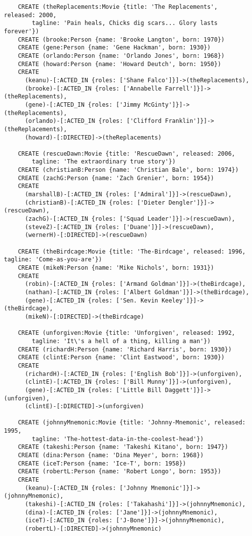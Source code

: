\begin{lstlisting}
	CREATE (theReplacements:Movie {title: 'The Replacements', released: 2000,
	    tagline: 'Pain heals, Chicks dig scars... Glory lasts forever'})
	CREATE (brooke:Person {name: 'Brooke Langton', born: 1970})
	CREATE (gene:Person {name: 'Gene Hackman', born: 1930})
	CREATE (orlando:Person {name: 'Orlando Jones', born: 1968})
	CREATE (howard:Person {name: 'Howard Deutch', born: 1950})
	CREATE
	  (keanu)-[:ACTED_IN {roles: ['Shane Falco']}]->(theReplacements),
	  (brooke)-[:ACTED_IN {roles: ['Annabelle Farrell']}]->(theReplacements),
	  (gene)-[:ACTED_IN {roles: ['Jimmy McGinty']}]->(theReplacements),
	  (orlando)-[:ACTED_IN {roles: ['Clifford Franklin']}]->(theReplacements),
	  (howard)-[:DIRECTED]->(theReplacements)
	
	CREATE (rescueDawn:Movie {title: 'RescueDawn', released: 2006,
	    tagline: 'The extraordinary true story'})
	CREATE (christianB:Person {name: 'Christian Bale', born: 1974})
	CREATE (zachG:Person {name: 'Zach Grenier', born: 1954})
	CREATE
	  (marshallB)-[:ACTED_IN {roles: ['Admiral']}]->(rescueDawn),
	  (christianB)-[:ACTED_IN {roles: ['Dieter Dengler']}]->(rescueDawn),
	  (zachG)-[:ACTED_IN {roles: ['Squad Leader']}]->(rescueDawn),
	  (steveZ)-[:ACTED_IN {roles: ['Duane']}]->(rescueDawn),
	  (wernerH)-[:DIRECTED]->(rescueDawn)
	
	CREATE (theBirdcage:Movie {title: 'The-Birdcage', released: 1996, tagline: 'Come-as-you-are'})
	CREATE (mikeN:Person {name: 'Mike Nichols', born: 1931})
	CREATE
	  (robin)-[:ACTED_IN {roles: ['Armand Goldman']}]->(theBirdcage),
	  (nathan)-[:ACTED_IN {roles: ['Albert Goldman']}]->(theBirdcage),
	  (gene)-[:ACTED_IN {roles: ['Sen. Kevin Keeley']}]->(theBirdcage),
	  (mikeN)-[:DIRECTED]->(theBirdcage)
	
	CREATE (unforgiven:Movie {title: 'Unforgiven', released: 1992,
	    tagline: 'It\'s a hell of a thing, killing a man'})
	CREATE (richardH:Person {name: 'Richard Harris', born: 1930})
	CREATE (clintE:Person {name: 'Clint Eastwood', born: 1930})
	CREATE
	  (richardH)-[:ACTED_IN {roles: ['English Bob']}]->(unforgiven),
	  (clintE)-[:ACTED_IN {roles: ['Bill Munny']}]->(unforgiven),
	  (gene)-[:ACTED_IN {roles: ['Little Bill Daggett']}]->(unforgiven),
	  (clintE)-[:DIRECTED]->(unforgiven)
	
	CREATE (johnnyMnemonic:Movie {title: 'Johnny-Mnemonic', released: 1995,
	    tagline: 'The-hottest-data-in-the-coolest-head'})
	CREATE (takeshi:Person {name: 'Takeshi Kitano', born: 1947})
	CREATE (dina:Person {name: 'Dina Meyer', born: 1968})
	CREATE (iceT:Person {name: 'Ice-T', born: 1958})
	CREATE (robertL:Person {name: 'Robert Longo', born: 1953})
	CREATE
	  (keanu)-[:ACTED_IN {roles: ['Johnny Mnemonic']}]->(johnnyMnemonic),
	  (takeshi)-[:ACTED_IN {roles: ['Takahashi']}]->(johnnyMnemonic),
	  (dina)-[:ACTED_IN {roles: ['Jane']}]->(johnnyMnemonic),
	  (iceT)-[:ACTED_IN {roles: ['J-Bone']}]->(johnnyMnemonic),
	  (robertL)-[:DIRECTED]->(johnnyMnemonic)
	

\end{lstlisting}
